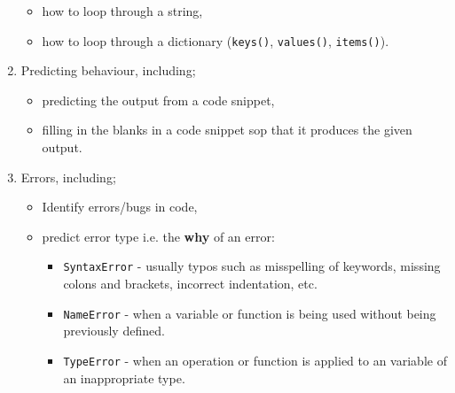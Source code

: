 \documentclass[11pt]{report}
\begin{document}
\begin{enumerate}[leftmargin=*]
\begin{itemize}
        \item how to loop through a string,
        \item how to loop through a dictionary ({\tt keys()}, {\tt values()}, {\tt items()}).
    \end{itemize}
    \item Predicting behaviour, including;
    \begin{itemize}
        \item predicting the output from a code snippet,
        \item filling in the blanks in a code snippet sop that it produces the given output.
    \end{itemize}
    \item Errors, including;
    \begin{itemize}
        \item Identify errors/bugs in code,
        \item predict error type i.e. the \textbf{why} of an error:
            \begin{itemize}
                \item {\tt SyntaxError} - usually typos such as misspelling of keywords, missing colons and brackets, incorrect indentation, etc.
                \item {\tt NameError} - when a variable or function is being used without being previously defined.
                \item {\tt TypeError} - when an operation or function is applied to an variable of an inappropriate type.
            \end{itemize}
    \end{itemize}
\end{enumerate}
\end{document}
